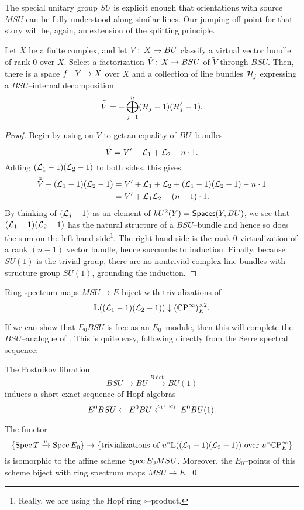The special unitary group $SU$ is explicit enough that orientations with source $MSU$ can be fully understood along similar lines.  Our jumping off point for that story will be, again, an extension of the splitting principle.
\begin{lemma}\label{SplittingPrincipleForBSU}
Let $X$ be a finite complex, and let $\tilde V\colon\thinspace X \to BU$ classify a virtual vector bundle of rank $0$ over $X$.  Select a factorization $\tilde{\tilde V}\colon\thinspace X \to BSU$ of $\tilde V$ through $BSU$.  Then, there is a space $f\colon\thinspace Y \to X$ over $X$ and a collection of line bundles $\mathcal{H}_j$ expressing a $BSU$--internal decomposition \[\tilde{\tilde V} = -\bigoplus_{j=1}^n (\mathcal{H}_j - 1)(\mathcal{H}'_j - 1).\]
\end{lemma}
\begin{proof}
Begin by using  on $V$ to get an equality of $BU$--bundles \[\tilde{\tilde V} = V' + \mathcal{L}_1 + \mathcal{L}_2 - n \cdot 1.\]  Adding $(\mathcal{L}_1 - 1)(\mathcal{L}_2 - 1)$ to both sides, this gives
\begin{align*}
\tilde{\tilde V} + (\mathcal{L}_1 - 1)(\mathcal{L}_2 - 1) & = V' + \mathcal{L}_1 + \mathcal{L}_2 + (\mathcal{L}_1 - 1)(\mathcal{L}_2 - 1) - n \cdot 1 \\
& = V' + \mathcal{L}_1\mathcal{L}_2 - (n-1) \cdot 1.
\end{align*}
By thinking of $(\mathcal{L}_j - 1)$ as an element of $kU^2(Y) = \mathsf{Spaces}(Y, BU)$, we see that $(\mathcal{L}_1 - 1)(\mathcal{L}_2 - 1)$ has the natural structure of a $BSU$--bundle and hence so does the sum on the left-hand side\footnote{Really, we are using the Hopf ring $\circ$--product.}.  The right-hand side is the rank $0$ virtualization of a rank $(n-1)$ vector bundle, hence succumbs to induction.  Finally, because $SU(1)$ is the trivial group, there are no nontrivial complex line bundles with structure group $SU(1)$, grounding the induction.
\end{proof}
\begin{corollary}
Ring spectrum maps $MSU \to E$ biject with trivializations of \[\ThomSheaf{(\L_1 - 1)(\L_2 - 1)} \downarrow (\CP^\infty)^{\times 2}_E. \qed \]
\end{corollary}

If we can show that $E_0 BSU$ is free as an $E_0$--module, then this will complete the $BSU$--analogue of .  This is quite easy, following directly from the Serre spectral sequence:
\begin{lemma}\label{BSUtoBUtoCPinftyIsSexseq}
The Postnikov fibration \[BSU \to BU \xrightarrow{B\det} BU(1)\] induces a short exact sequence of Hopf algebras \[E^0 BSU \from E^0 BU \xleftarrow{c_1 \mapsfrom c_1} E^0 BU(1). \qed\]
\end{lemma}
\begin{corollary}\label{BSUTriumvirate}
The functor \[\{\operatorname{Spec} T \xrightarrow{u} \operatorname{Spec} E_0\} \to \left\{ \text{trivializations of $u^* \mathbb{L}((\mathcal{L}_1 - 1)(\mathcal{L}_2 - 1))$ over $u^* \mathbb{C}\mathrm P^\infty_E$} \right\}\] is isomorphic to the affine scheme $\operatorname{Spec} E_0 MSU$.  Moreover, the $E_0$--points of this scheme biject with ring spectrum maps $MSU \to E$. \qed
\end{corollary}

